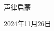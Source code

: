 \documentclass[12pt]{article}
\begin{document}
	
	\begin{titlepage}
		\centering
		\vspace*{3cm}
		{\Huge 声律启蒙}
		
		\vspace{2cm}
		
		\vfill
		{\large 2024年11月26日}
		\date{}
	\end{titlepage}
	
	\maketitle
	
	\thispagestyle{empty}
	\mbox{}
	
	\clearpage
	\setcounter{page}{1}
	\pagestyle{plain}
	
	
	\centering
	
\end{document}
